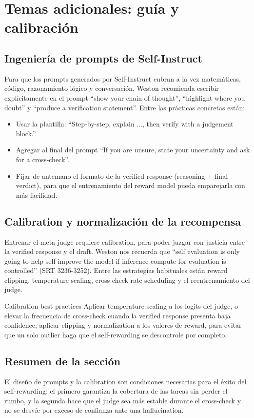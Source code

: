 \section{Temas adicionales: guía y calibración}
\subsection{Ingeniería de prompts de Self-Instruct}
Para que los prompts generados por Self-Instruct cubran a la vez matemáticas, código, razonamiento lógico y conversación, Weston recomienda escribir explícitamente en el prompt ``show your chain of thought'', ``highlight where you doubt'' y ``produce a verification statement''. Entre las prácticas concretas están:
\begin{itemize}
    \item Usar la plantilla: ``Step-by-step, explain ..., then verify with a judgement block.''.
    \item Agregar al final del prompt ``If you are unsure, state your uncertainty and ask for a cross-check''.
    \item Fijar de antemano el formato de la verified response (reasoning + final verdict), para que el entrenamiento del reward model pueda emparejarla con más facilidad.
\end{itemize}
\mbox{}

\subsection{Calibration y normalización de la recompensa}
Entrenar el meta judge requiere calibration, para poder juzgar con justicia entre la verified response y el draft. Weston nos recuerda que ``self evaluation is only going to help self-improve the model if inference compute for evaluation is controlled'' (SRT 3236-3252). Entre las estrategias habituales están reward clipping, temperature scaling, cross-check rate scheduling y el reentrenamiento del judge.

\begin{knowledgebox}{Calibration best practices}
Aplicar temperature scaling a los logits del judge, o elevar la frecuencia de cross-check cuando la verified response presenta baja confidence; aplicar clipping y normalization a los valores de reward, para evitar que un solo outlier haga que el self-rewarding se descontrole por completo.
\end{knowledgebox}

\subsection{Resumen de la sección}
El diseño de prompts y la calibration son condiciones necesarias para el éxito del self-rewarding: el primero garantiza la cobertura de las tareas sin perder el rumbo, y la segunda hace que el judge sea más estable durante el cross-check y no se desvíe por exceso de confianza ante una hallucination.
